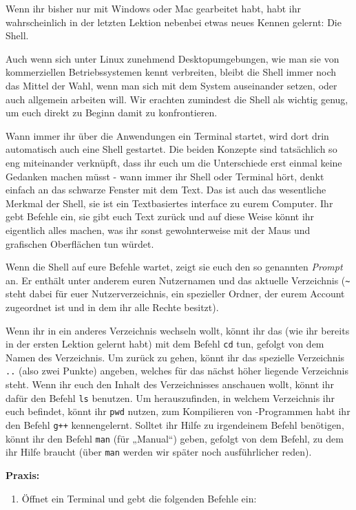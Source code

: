 
Wenn ihr bisher nur mit Windows oder Mac gearbeitet habt, habt ihr
wahrscheinlich in der letzten Lektion nebenbei etwas neues Kennen gelernt: Die
Shell.

Auch wenn sich unter Linux zunehmend Desktopumgebungen, wie man sie von
kommerziellen Betriebssystemen kennt verbreiten, bleibt die Shell immer noch das
Mittel der Wahl, wenn man sich mit dem System auseinander setzen, oder auch
allgemein arbeiten will. Wir erachten zumindest die Shell als wichtig genug, um
euch direkt zu Beginn damit zu konfrontieren.

Wann immer ihr über die Anwendungen ein Terminal startet, wird dort drin
automatisch auch eine Shell gestartet. Die beiden Konzepte sind tatsächlich so
eng miteinander verknüpft, dass ihr euch um die Unterschiede erst einmal keine
Gedanken machen müsst - wann immer ihr Shell oder Terminal hört, denkt einfach
an das schwarze Fenster mit dem Text. Das ist auch das wesentliche Merkmal der
Shell, sie ist ein Textbasiertes interface zu eurem Computer. Ihr gebt Befehle
ein, sie gibt euch Text zurück und auf diese Weise könnt ihr eigentlich alles
machen, was ihr sonst gewohnterweise mit der Maus und grafischen Oberflächen
tun würdet.

Wenn die Shell auf eure Befehle wartet, zeigt sie euch den so genannten
\emph{Prompt} an. Er enthält unter anderem euren Nutzernamen und das aktuelle
Verzeichnis (\verb|~| steht dabei für euer Nutzerverzeichnis, ein spezieller
Ordner, der eurem Account zugeordnet ist und in dem ihr alle Rechte besitzt).

Wenn ihr in ein anderes Verzeichnis wechseln wollt, könnt ihr das (wie ihr
bereits in der ersten Lektion gelernt habt) mit dem Befehl \texttt{cd} tun,
gefolgt von dem Namen des Verzeichnis. Um zurück zu gehen, könnt ihr das
spezielle Verzeichnis \texttt{..} (also zwei Punkte) angeben, welches für das
nächst höher liegende Verzeichnis steht. Wenn ihr euch den Inhalt des
Verzeichnisses anschauen wollt, könnt ihr dafür den Befehl \texttt{ls}
benutzen. Um herauszufinden, in welchem Verzeichnis ihr euch befindet, könnt
ihr \texttt{pwd} nutzen, zum Kompilieren von \Cpp-Programmen habt ihr den Befehl
\texttt{g++} kennengelernt. Solltet ihr Hilfe zu irgendeinem Befehl benötigen,
könnt ihr den Befehl \texttt{man} (für „Manual“) geben, gefolgt von dem Befehl,
zu dem ihr Hilfe braucht (über \texttt{man} werden wir später noch
ausführlicher reden).

\textbf{Praxis:}
\begin{enumerate}
    \item Öffnet ein Terminal und gebt die folgenden Befehle ein:
\end{enumerate}

